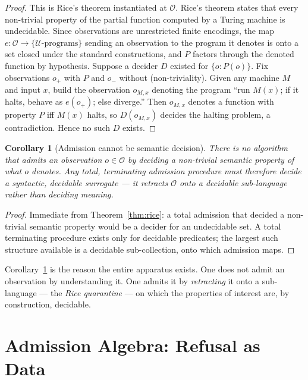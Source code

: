 \documentclass[11pt,oneside]{book}
\theoremstyle{definition}
\theoremstyle{plain}
\newtheorem{corollary}[theorem]{Corollary}
\theoremstyle{remark}
\newcommand{\Obs}{\mathcal{O}}                 %
\begin{document}
\begin{proof}
This is Rice's theorem \cite{rice1953} instantiated at $\Obs$. Rice's theorem states that
every non-trivial property of the partial function computed by a Turing machine is
undecidable. Since observations are unrestricted finite encodings, the map
$e:\Obs\to\{\text{$\mathcal U$-programs}\}$ sending an observation to the program it denotes
is onto a set closed under the standard constructions, and $P$ factors through the denoted
function by hypothesis. Suppose a decider $D$ existed for $\{o:P(o)\}$. Fix observations
$o_{+}$ with $P$ and $o_{-}$ without (non-triviality). Given any machine $M$ and input $x$,
build the observation $o_{M,x}$ denoting the program ``run $M(x)$; if it halts, behave as
$e(o_{+})$; else diverge.'' Then $o_{M,x}$ denotes a function with property $P$ iff $M(x)$
halts, so $D(o_{M,x})$ decides the halting problem, a contradiction. Hence no such $D$
exists. \end{proof}

\begin{corollary}[Admission cannot be semantic decision]\label{cor:noadmit}
There is no algorithm that admits an observation $o\in\Obs$ by deciding a non-trivial
semantic property of what $o$ denotes. Any total, terminating admission procedure must
therefore decide a \emph{syntactic}, decidable surrogate --- it retracts $\Obs$ onto a
decidable sub-language rather than deciding meaning.
\end{corollary}

\begin{proof}
Immediate from Theorem~\ref{thm:rice}: a total admission that decided a non-trivial
semantic property would be a decider for an undecidable set. A total terminating procedure
exists only for decidable predicates; the largest such structure available is a decidable
sub-collection, onto which admission maps. \end{proof}

Corollary~\ref{cor:noadmit} is the reason the entire apparatus exists. One does not admit
an observation by understanding it. One admits it by \emph{retracting} it onto a
sub-language --- the \emph{Rice quarantine} --- on which the properties of interest are, by
construction, decidable.

\chapter{Admission Algebra: Refusal as Data}
\label{ch:admission_algebra}
\end{document}
